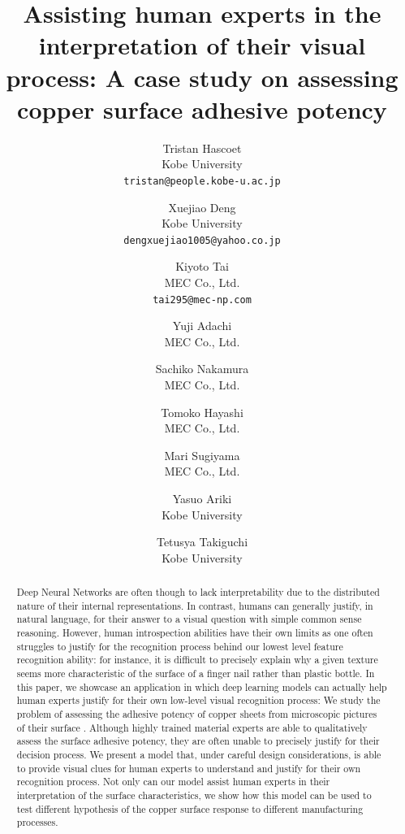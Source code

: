 \documentclass[10pt,twocolumn,letterpaper]{article}
\begin{document}
	
	\title{Assisting human experts in the interpretation of their visual process: A case study on assessing copper surface adhesive potency}%
	
	\author{
		Tristan Hascoet\\
		Kobe University\\
		{\tt\small tristan@people.kobe-u.ac.jp}
		\and
		Xuejiao Deng\\
		Kobe University\\
		{\tt\small dengxuejiao1005@yahoo.co.jp}
		\and
		Kiyoto Tai\\
		MEC Co., Ltd.\\
		{\tt\small tai295@mec-np.com}
		\and
		Yuji Adachi \\
		MEC Co., Ltd. \\
		\and
		Sachiko Nakamura\\
		MEC Co., Ltd.\\
		\and
		Tomoko Hayashi\\
		MEC Co., Ltd.\\
		\and
		Mari Sugiyama\\
		MEC Co., Ltd.\\
		\and
		Yasuo Ariki\\
		Kobe University\\
		\and
		Tetusya Takiguchi\\
		Kobe University\\
	}
	
	\maketitle
	
	
\begin{abstract}
Deep Neural Networks are often though to lack interpretability due to the distributed nature of their internal representations. In contrast, humans can generally justify, in natural language, for their answer to a visual question with simple common sense reasoning. However, human introspection abilities have their own limits as one often struggles to justify for the recognition process behind our lowest level feature recognition ability: for instance, it is difficult to precisely explain why a given texture seems more characteristic of the surface of a finger nail rather than plastic bottle.
In this paper, we showcase an application in which deep learning models can actually  help human experts justify for their own low-level visual recognition process: We study the problem of assessing the adhesive potency of copper sheets from microscopic pictures of their surface . Although highly trained material experts are able to qualitatively assess the surface adhesive potency, they are often unable to precisely justify for their decision process. We present a model that, under careful design considerations, is able to provide visual clues for human experts to understand and justify for their own recognition process. 
Not only can our model assist human experts in their interpretation of the surface characteristics, 
we show how this model can be used to test different hypothesis of the copper surface response to different manufacturing processes. 
\end{abstract}
	
\end{document}
